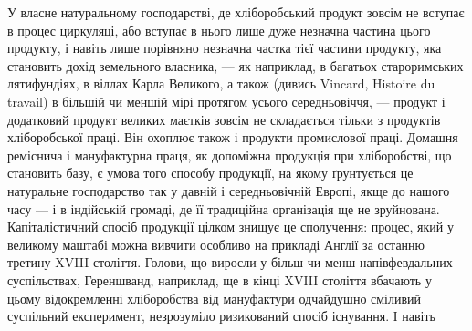 У власне натуральному господарстві, де хліборобський продукт зовсім не
вступає в процес циркуляці, або вступає в нього лише дуже незначна частина
цього продукту, і навіть лише порівняно незначна частка тієї частини продукту,
яка становить дохід земельного власника, — як наприклад, в багатьох
староримських лятифундіях, в віллах Карла Великого, а також (дивись Vincard,
Histoire du travail) в більшій чи меншій мірі протягом усього середньовіччя, —
продукт і додатковий продукт великих маєтків зовсім не складається тільки
з продуктів хліборобської праці. Він охоплює також і продукти промислової
праці. Домашня реміснича і мануфактурна праця, як допоміжна продукція
при хліборобстві, що становить базу, є умова того способу продукції, на якому
ґрунтується це натуральне господарство так у давній і середньовічній Европі, якще
до нашого часу — і в індійській громаді, де її традиційна організація ще не
зруйнована. Капіталістичний спосіб продукції цілком знищує це сполучення:
процес, який у великому маштабі можна вивчити особливо на прикладі Англії
за останню третину XVIII століття. Голови, що виросли у більш чи менш напівфевдальних
суспільствах, Гереншванд, наприклад, ще в кінці XVIII століття
вбачають у цьому відокремленні хліборобства від мануфактури одчайдушно сміливий
суспільний експеримент, незрозуміло ризикований спосіб існування. І навіть
\parbreak{}  %
